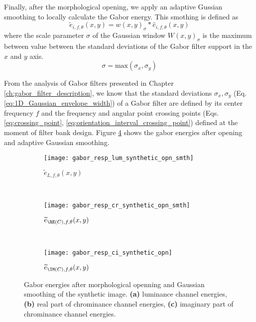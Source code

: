 Finally, after the morphological opening, we apply an adaptive Gussian smoothing to locally calculate the Gabor energy. This smothing is defined as
\begin{equation}\label{eq:gabor_energy}
	\widetilde{e}_{i, f, \theta}(x,y) = w(x, y)_\sigma\ast \widehat{e}_{i, f, \theta}(x,y)
\end{equation}
where the scale parameter $\sigma$ of the Gaussian window $W(x,y)_\sigma$ is the maximum between value between the standard deviations of the Gabor filter support in the $x$ and $y$ axis.
\begin{equation}\label{eq:gauss_sigma_smth}
	\sigma = \mathrm{max}(\sigma_x, \sigma_y)
\end{equation}

From the analysis of Gabor filters presented in Chapter \ref{ch:gabor_filter_description}, we know that the standard deviations $\sigma_x, \sigma_y$ (Eq. \eqref{eq:1D_Gaussian_envelope_width}) of a Gabor filter are defined by its center frequency $f$ and the frequency and angular point crossing points (Eqs. \eqref{eq:crossing_point}, \eqref{eq:orientation_interval_crossing_point}) defined at the moment of filter bank design. Figure \ref{fig:synthetic_img_gresponses_opn_smth} shows the gabor energies after opening and adaptive Gaussian smoothing. 

\begin{figure}[!ht]
    \centering
    \begin{subfigure}[b]{\textwidth}   
        \texttt{[image: gabor\_resp\_lum\_synthetic\_opn\_smth]}
        \caption{$\widetilde{e}_{L, f, \theta}(x,y)$} 
        \label{fig:lum_gabor_energies_opn_smth}
    \end{subfigure} \\ [2ex]   
    \begin{subfigure}[b]{\textwidth}   
    	\texttt{[image: gabor\_resp\_cr\_synthetic\_opn\_smth]}
    	\caption{$\widetilde{e}_{\RE(C), f, \theta}(x,y)$}
        \label{fig:cr_gabor_energie_opn_smth}
    \end{subfigure} \\ [2ex]    	
    \begin{subfigure}[b]{\textwidth}  
        \texttt{[image: gabor\_resp\_ci\_synthetic\_opn]}
        \caption{$\widetilde{e}_{\IM(C), f, \theta}(x,y)$}
        \label{fig:ci_gabor_energies_opn_smth} 
    \end{subfigure} 
    	    
    \caption{Gabor energies after morphological openning and Gaussian smoothing of the synthetic image. \small\textbf{\textsf{(a)}} luminance channel energies, \small\textbf{\textsf{(b)}} real part of chrominance channel energies, \small\textbf{\textsf{(c)}} imaginary part of chrominance channel energies.}\label{fig:synthetic_img_gresponses_opn_smth}    
\end{figure}



